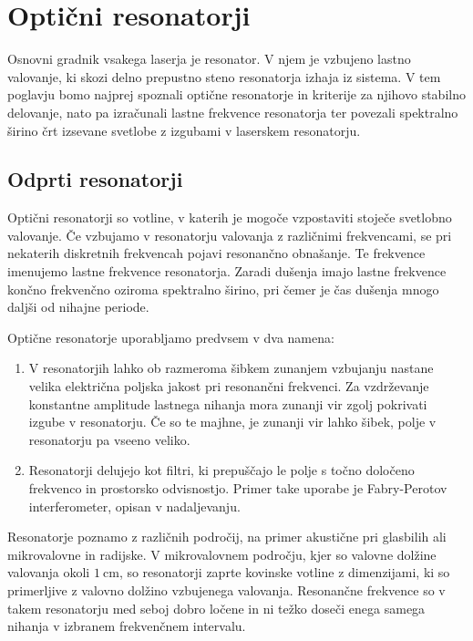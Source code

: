 
\chapter{Optični resonatorji}
Osnovni gradnik vsakega laserja je resonator. V njem je vzbujeno lastno valovanje,
ki skozi delno prepustno steno resonatorja izhaja iz sistema. V tem poglavju bomo 
najprej spoznali optične resonatorje in kriterije za njihovo stabilno delovanje,
nato pa izračunali lastne frekvence resonatorja ter povezali spektralno širino črt
izsevane svetlobe z izgubami v laserskem resonatorju. 

\section{Odprti resonatorji}
Optični resonatorji so votline, v katerih je mogoče 
vzpostaviti stoječe svetlobno valovanje. Če vzbujamo v resonatorju valovanja z 
različnimi frekvencami, se pri nekaterih diskretnih frekvencah pojavi resonančno
obnašanje. Te frekvence imenujemo lastne frekvence
resonatorja. Zaradi dušenja imajo lastne frekvence končno frekvenčno oziroma spektralno 
širino, pri čemer je čas dušenja mnogo daljši od nihajne periode. 

Optične resonatorje uporabljamo predvsem v dva namena:
\begin{enumerate}
\item V resonatorjih lahko ob razmeroma šibkem zunanjem vzbujanju nastane velika
električna poljska jakost pri resonančni frekvenci. Za vzdrževanje
konstantne amplitude lastnega nihanja mora zunanji vir zgolj pokrivati izgube
v resonatorju. Če so te majhne, je zunanji vir lahko šibek, polje
v resonatorju pa vseeno veliko.\\
\item Resonatorji delujejo kot filtri, ki prepuščajo le polje s točno  
določeno frekvenco in prostorsko odvisnostjo. Primer take uporabe je 
Fabry-Perotov interferometer, opisan 
v nadaljevanju. 
\end{enumerate}

Resonatorje poznamo z različnih področij, na primer akustične pri glasbilih ali 
mikrovalovne in radijske. V mikrovalovnem področju, kjer so valovne dolžine valovanja
okoli $1~\si{\centi\metre}$, 
so resonatorji zaprte kovinske votline z dimenzijami, ki so primerljive z 
valovno dolžino vzbujenega valovanja. Resonančne frekvence so v takem resonatorju 
med seboj dobro ločene in ni težko doseči enega samega nihanja v izbranem 
frekvenčnem intervalu.

